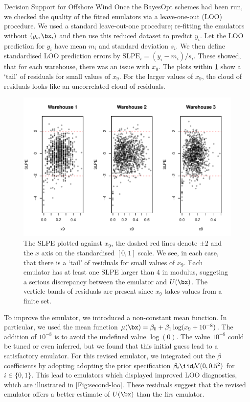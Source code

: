 \begin{chapter}{Decision Support for Offshore Wind \label{Ch:ds-for-ow}}
Once the BayesOpt schemes had been run, we checked the quality of the fitted emulators via a leave-one-out (LOO) procedure. We used a standard leave-out-one procedure; re-fitting the emulators without $(y_i, \bx_i)$ and then use this reduced dataset to predict $y_i$. Let the LOO prediction for $y_i$ have mean $m_i$ and standard deviation $s_i$. We then define standardised LOO prediction errors by $\text{SLPE}_i  = (y_i  - m_i)/s_i$. These showed, that for each warehouse, there was an issue with $x_9$.  The plots within \cref{Fig:first-loo} show a `tail' of residuals for small values of $x_9$. For the larger values of $x_9$, the cloud of residuals looks like an uncorrelated cloud of residuals.
\begin{figure}
  \centering
  \includegraphics{fig-ds/first-resids.pdf}
  \caption{The SLPE plotted against $x_9$, the dashed red lines denote $\pm 2$ and the $x$ axis on the standardised $[0,1]$ scale. We see, in each case, that there is a `tail' of residuals for small values of $x_9$. Each emulator has at least one SLPE larger than $4$ in modulus, suggeting a serious discrepancy between the emulator and $U(\bx)$. The verticle bands of residuals are present since $x_9$ takes values from a finite set. \label{Fig:first-loo}}
\end{figure}
To improve the emulator, we introduced a non-constant mean function. In particular, we used the mean function $\mu(\bx) = \beta_0 + \beta_1 \log (x_9 + 10^{-8})$. The addition of $10^{-8}$ is to avoid the undefined value $\log(0)$. The value $10^{-8}$ could be tuned or even inferred, but we found that this initial guess lead to a satisfactory emulator. For this revised emulator, we integrated out the $\beta$ coefficients by adopting adopting the prior specification $\beta_i \iid \mathcal{N}(0, 0.5^2)$ for $i \in \{0, 1\}$. This lead to emulators which displayed improved LOO diagnostics, which are illustrated in \cref{Fig:second-loo}. These residuals suggest that the revised emulator offers a better estimate of $U(\bx)$ than the firs emulator.

\end{chapter}
